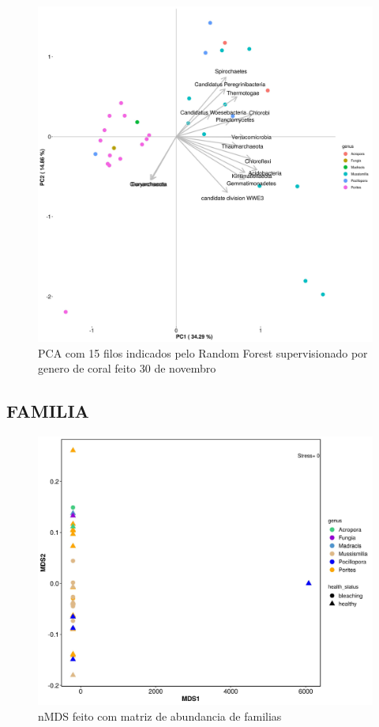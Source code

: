 \documentclass[12pt, a4paper]{report}
\begin{document}
\begin{figure}[H]
\centering
\includegraphics[scale=0.4]{figures/filos/pca_corais_mg_rast_rf_supervisionado_genus_15_filos_30_10_2018.jpg}
\caption{PCA com 15 filos indicados pelo Random Forest supervisionado por genero de coral feito 30 de novembro}
\label{fig:PCAfeitocom15filosrandomForestsupervisionadoporgenerodecoral}
\end{figure}

\subsection{FAMILIA}
\begin{figure}[H]
\centering
\includegraphics[scale=0.4]{figures/familia/nMDS_taxonomic_family_corais_2018_10_30.jpg}
\caption{nMDS feito com matriz de abundancia de familias}
\label{fig:nMDSfeito30deoutubroparafamilia}
\end{figure}
\end{document}
